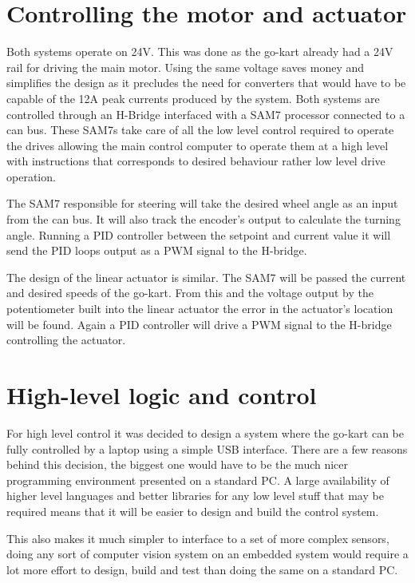 \section{Controlling the motor and actuator}

Both systems operate on 24V. This was done as the go-kart already had a 24V rail
for driving the main motor. Using the same voltage saves money and simplifies
the design as it precludes the need for converters that would have to be capable
of the 12A peak currents produced by the system. Both systems are controlled
through an H-Bridge interfaced with a SAM7 processor connected to a can bus.
These SAM7s take care of all the low level control required to operate the
drives allowing the main control computer to operate them at a high level with
instructions that corresponds to desired behaviour rather low level drive
operation.

The SAM7 responsible for steering will take the desired wheel angle as an input
from the can bus. It will also track the encoder's output to calculate the
turning angle. Running a PID controller between the setpoint and current value
it will send the PID loops output as a PWM signal to the H-bridge.

The design of the linear actuator is similar. The SAM7 will be passed the
current and desired speeds of the go-kart. From this and the voltage output by
the potentiometer built into the linear actuator the error in the actuator's
location will be found. Again a PID controller will drive a PWM signal to the
H-bridge controlling the actuator.

\section{High-level logic and control}

For high level control it was decided to design a system where the go-kart can
be fully controlled by a laptop using a simple USB interface.  There are a few
reasons behind this decision, the biggest one would have to be the much nicer
programming environment presented on a standard PC.  A large availability of
higher level languages and better libraries for any low level stuff that may be
required means that it will be easier to design and build the control system.

This also makes it much simpler to interface to a set of more complex sensors,
doing any sort of computer vision system on an embedded system would require a
lot more effort to design, build and test than doing the same on a standard PC.

